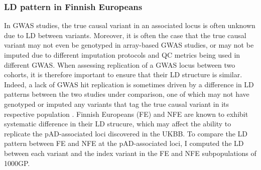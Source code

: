 \subsubsection{LD pattern in Finnish Europeans}
In GWAS studies, the true causal variant in an associated locus is often unknown due to LD between variants. Moreover, it is often the case that the true causal variant may not even be genotyped in array-based GWAS studies, or may not be imputed due to different imputation protocols and QC metrics being used in different GWAS. When assessing replication of a GWAS locus between two cohorts, it is therefore important to ensure that their LD structure is similar. Indeed, a lack of GWAS hit replication is sometimes driven by a difference in LD patterns between the two studies under comparison, one of which may not have genotyped or imputed any variants that tag the true causal variant in its respective population \cite{Kraft2009-xg}. Finnish Europeans (FE) and NFE are known to exhibit systematic difference in their LD strucure, which may affect the ability to replicate the pAD-associated loci discovered in the UKBB. To compare the LD pattern between FE and NFE at the pAD-associated loci, I computed the LD between each variant and the index variant in the FE and NFE subpopulations of 1000GP.\\






